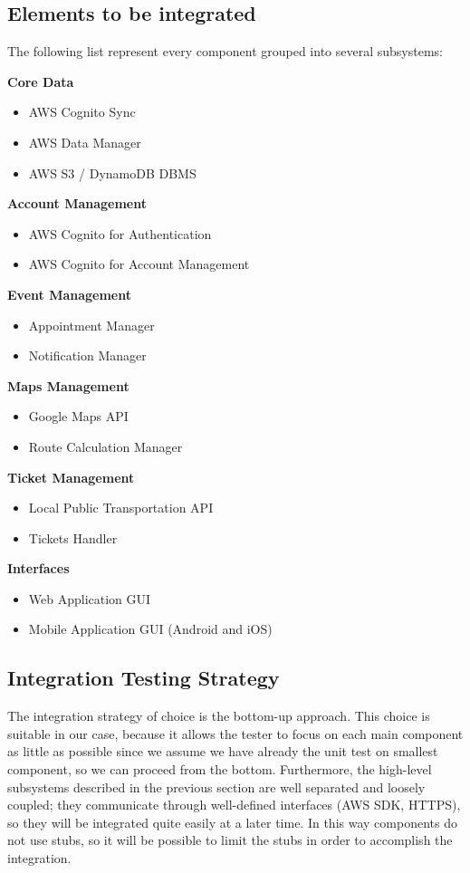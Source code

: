 \subsection*{Elements to be integrated}
\label{sub:delemenetsIntegrated}
The following list represent every component grouped into several subsystems: \newline

\textbf{Core Data}
\begin{itemize}
\item AWS Cognito Sync
\item AWS Data Manager
\item AWS S3 / DynamoDB DBMS
\end{itemize}

\textbf{Account Management}
\begin{itemize}
	\item AWS Cognito for Authentication
	\item AWS Cognito for Account Management
\end{itemize}

\textbf{Event Management}
\begin{itemize}
  \item Appointment Manager
  \item Notification Manager
\end{itemize}

\textbf{Maps Management}
\begin{itemize}
	\item Google Maps API
    \item Route Calculation Manager
\end{itemize}

\textbf{Ticket Management}
\begin{itemize}
	\item Local Public Transportation API
	\item Tickets Handler 
\end{itemize}

\textbf{Interfaces}
\begin{itemize}
\item Web Application GUI
\item Mobile Application GUI (Android and iOS)
\end{itemize}

\subsection*{Integration Testing Strategy}
The integration strategy of choice is the bottom-up approach. 
This choice is suitable in our case, because it allows the tester to focus on each main component as little as possible since we assume we have already the unit test on smallest component, so we can proceed from the bottom.
Furthermore, the high-level subsystems described in the previous section are well separated and loosely coupled; they communicate through well-defined interfaces (AWS SDK, HTTPS), so they will be integrated quite easily at a later time. In this way components do not use stubs, so it will be possible to limit the stubs in order to accomplish the integration.

